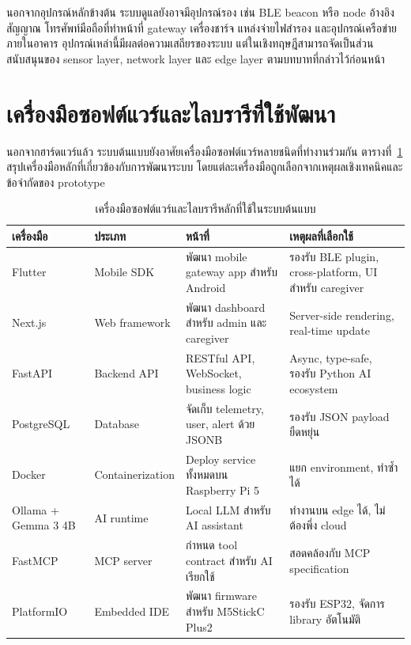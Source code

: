 นอกจากอุปกรณ์หลักข้างต้น ระบบดูแลยังอาจมีอุปกรณ์รอง เช่น BLE beacon หรือ node อ้างอิงสัญญาณ โทรศัพท์มือถือที่ทำหน้าที่ gateway เครื่องชาร์จ แหล่งจ่ายไฟสำรอง และอุปกรณ์เครือข่ายภายในอาคาร อุปกรณ์เหล่านี้มีผลต่อความเสถียรของระบบ แต่ในเชิงทฤษฎีสามารถจัดเป็นส่วนสนับสนุนของ sensor layer, network layer และ edge layer ตามบทบาทที่กล่าวไว้ก่อนหน้า

\FloatBarrier

\section{เครื่องมือซอฟต์แวร์และไลบรารีที่ใช้พัฒนา}
\label{sec:ch2_software_tools}

นอกจากฮาร์ดแวร์แล้ว ระบบต้นแบบยังอาศัยเครื่องมือซอฟต์แวร์หลายชนิดที่ทำงานร่วมกัน ตารางที่~\ref{tab:ch2_software_tools} สรุปเครื่องมือหลักที่เกี่ยวข้องกับการพัฒนาระบบ โดยแต่ละเครื่องมือถูกเลือกจากเหตุผลเชิงเทคนิคและข้อจำกัดของ prototype

\begin{table}[htbp]
    \centering
    \caption{เครื่องมือซอฟต์แวร์และไลบรารีหลักที่ใช้ในระบบต้นแบบ}
    \label{tab:ch2_software_tools}
    \small
    \begin{tabular}{>{\raggedright\arraybackslash}p{}
                    >{\raggedright\arraybackslash}p{}
                    >{\raggedright\arraybackslash}p{}
                    >{\raggedright\arraybackslash}p{}}
        \toprule
        เครื่องมือ & ประเภท & หน้าที่ & เหตุผลที่เลือกใช้ \\ \midrule
        Flutter & Mobile SDK & พัฒนา mobile gateway app สำหรับ Android & รองรับ BLE plugin, cross-platform, UI สำหรับ caregiver \\ \midrule
        Next.js & Web framework & พัฒนา dashboard สำหรับ admin และ caregiver & Server-side rendering, real-time update \\ \midrule
        FastAPI & Backend API & RESTful API, WebSocket, business logic & Async, type-safe, รองรับ Python AI ecosystem \\ \midrule
        PostgreSQL & Database & จัดเก็บ telemetry, user, alert ด้วย JSONB & รองรับ JSON payload ยืดหยุ่น \\ \midrule
        Docker & Containerization & Deploy service ทั้งหมดบน Raspberry Pi 5 & แยก environment, ทำซ้ำได้ \\ \midrule
        Ollama + Gemma 3 4B & AI runtime & Local LLM สำหรับ AI assistant & ทำงานบน edge ได้, ไม่ต้องพึ่ง cloud \\ \midrule
        FastMCP & MCP server & กำหนด tool contract สำหรับ AI เรียกใช้ & สอดคล้องกับ MCP specification \\ \midrule
        PlatformIO & Embedded IDE & พัฒนา firmware สำหรับ M5StickC Plus2 & รองรับ ESP32, จัดการ library อัตโนมัติ \\ \bottomrule
    \end{tabular}
\end{table}

